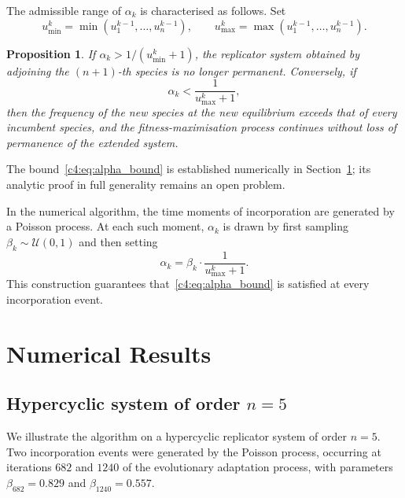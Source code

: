 \documentclass[12pt]{report}
\newtheorem{proposition}[theorem]{Proposition}
\theoremstyle{definition}
\theoremstyle{remark}
\begin{document}
The admissible range of $\alpha_k$ is characterised as follows. Set
\[
    u_{\min}^k = \min(u_1^{k-1}, \ldots, u_n^{k-1}), \qquad
    u_{\max}^k = \max(u_1^{k-1}, \ldots, u_n^{k-1}).
\]

\begin{proposition}\label{c4:prop:alpha}
If $\alpha_k > 1/(u_{\min}^k + 1)$, the replicator system obtained by
adjoining the $(n+1)$-th species is no longer permanent. Conversely, if
\begin{equation}
    \alpha_k < \frac{1}{u_{\max}^k + 1},
    \label{c4:eq:alpha_bound}
\end{equation}
then the frequency of the new species at the new equilibrium exceeds that of
every incumbent species, and the fitness-maximisation process continues without
loss of permanence of the extended system.
\end{proposition}

The bound~\eqref{c4:eq:alpha_bound} is established numerically in
Section~\ref{c4:section:4.2}; its analytic proof in full generality remains an open
problem.

In the numerical algorithm, the time moments of incorporation are generated by a
Poisson process. At each such moment, $\alpha_k$ is drawn by first sampling
$\beta_k \sim \mathcal{U}(0,1)$ and then setting
\begin{equation}
    \alpha_k = \beta_k \cdot \frac{1}{u_{\max}^k + 1}.
    \label{c4:eq4.8}
\end{equation}
This construction guarantees that~\eqref{c4:eq:alpha_bound} is satisfied at every
incorporation event.

\section{Numerical Results}\label{c4:section:4.2}

\subsection*{Hypercyclic system of order $n = 5$}

We illustrate the algorithm on a hypercyclic replicator system of order $n = 5$.
Two incorporation events were generated by the Poisson process, occurring at
iterations $682$ and $1240$ of the evolutionary adaptation process, with
parameters $\beta_{682} = 0.829$ and $\beta_{1240} = 0.557$.
\end{document}
